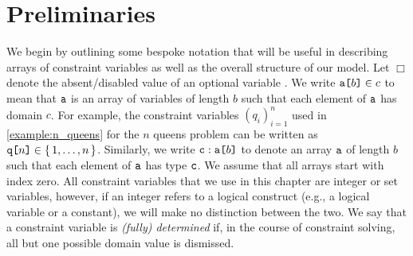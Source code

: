 \section{Preliminaries}


We begin by outlining some bespoke notation that will be useful in describing
arrays of constraint variables as well as the overall structure of our model.
Let $\Box$ denote the absent/disabled value of an optional variable
\citep{DBLP:conf/cpaior/MearsSSTMW14}. We write $\arrayd{a}{b}{c}$ to mean that
$\variable{a}$ is an array of variables of length $b$ such that each element of
$\variable{a}$ has domain $c$. For example, the constraint variables
${(q_i)}_{i=1}^n$ used in \cref{example:n_queens} for the $n$ queens problem can
be written as $\arrayd{q}{n}{\{\, 1, \dots, n \,\}}$. Similarly, we write
$\arrayt{a}{b}{c}$ to denote an array $\variable{a}$ of length $b$ such that
each element of $\variable{a}$ has type $\variable{c}$. We assume that all
arrays start with index zero. All constraint variables that we use in this
chapter are integer or set variables, however, if an integer refers to a logical
construct (e.g., a logical variable or a constant), we will make no distinction
between the two. We say that a constraint variable is \emph{(fully) determined}
if, in the course of constraint solving, all but one possible domain value is
dismissed.


